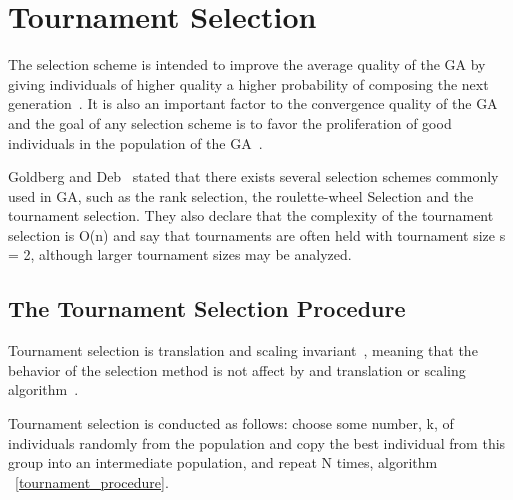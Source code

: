 \section{Tournament Selection}\label{sec:background:Selection Scheme} 

The selection scheme is intended to improve the average quality of the GA by giving individuals of higher quality a higher probability of composing the next generation~\cite{blickle1995mathematical}. It is also an important factor to the convergence quality of the GA and the goal of any selection scheme is to favor the proliferation of good individuals in the population of the GA~\cite{harik1999gambler}. 

Goldberg and Deb~\cite{goldberg1991comparative} stated that there exists several selection schemes commonly used in GA, such as the rank selection, the roulette-wheel Selection and the tournament selection. They also declare that the complexity of the tournament selection is O(n) and say that tournaments are often held with tournament size s = 2, although larger tournament sizes may be analyzed.

\subsection{The Tournament Selection Procedure}\label{sec:background:tournament_selection} 

Tournament selection is translation and scaling invariant~\cite{maza1993analysis}, meaning that the behavior of the selection method is not affect by and translation or scaling algorithm~\cite{back2000evolutionary}.

Tournament selection is conducted as follows: choose some number, k, of individuals randomly from the population and copy the best individual from this group into an intermediate population, and repeat N times, algorithm ~\ref{tournament_procedure}. 

